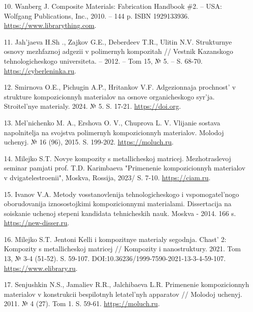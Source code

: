\begin{references}
10. Wanberg J. Composite Materials: Fabrication Handbook \#2. – USA:
Wolfgang Publications, Inc., 2010. – 144 p. ISBN
1929133936. \href{https://www.librarything.com/work/9709968}{https://www.librarything.com}.

11. Jah'jaeva H.Sh ., Zajkov G.E., Deberdeev T.R., Ulitin
N.V. Strukturnye osnovy mezhfaznoj adgezii v polimernyh kompozitah //
Vestnik Kazanskogo tehnologicheskogo universiteta. – 2012. – Tom 15, №
5. – S. 68-70.
\href{https://cyberleninka.ru/article/n/strukturnye-osnovy-mezhfaznoy-adgezii-nanoadgezii-v-polimernyh-kompozitah?ysclid=m6j2st57s6418214983}{https://cyberleninka.ru}. 

12. Smirnova O.E., Pichugin A.P., Hritankov V.F. Adgezionnaja
prochnost' v strukture kompozicionnyh materialov na osnove
organicheskogo syr'ja. Stroitel'nye materialy. 2024. №
5. S. 17-21. \href{https://doi.org/10.31659/0585-430X-2024-824-5-17-21}{https://doi.org}.

13. Mel'nichenko M. A., Ershova O. V., Chuprova L. V. Vlijanie sostava
napolnitelja na svojstva polimer\-nyh kompozicionnyh materialov. Molodoj
uchenyj. № 16 (96),
2015. S. 199-202. \href{https://moluch.ru/archive/96/21554/}{https://moluch.ru}.

14. Milejko S.T. Novye kompozity s metallicheskoj
matricej. Mezhotraslevoj seminar pamjati prof. T.D. Karimbaeva
"Primenenie kompozicionnyh materialov v dvigatelestroenii", Moskva,
Rossija, 2023/
S. 7-10. \href{https://ciam.ru/composites_theses/mileiko.pdf}{https://ciam.ru}.

15. Ivanov V.A. Metody vosstanovlenija tehnologicheskogo i
vspomogatel'nogo oborudovanija iznoso\-stojkimi kompozicionnymi
materialami. Dissertacija na soiskanie uchenoj stepeni kandidata
tehnicheskih nauk. Moskva - 2014. 166
s. \href{https://new-disser.ru/_avtoreferats/01007923651.pdf?ysclid=m6j2zfwyqg324913287}{https://new-disser.ru}.

16. Milejko S.T. Jentoni Kelli i kompozitnye materialy
segodnja. Chast' 2: Kompozity s metallicheskoj matricej // Kompozity i
nanostruktury. 2021. Tom 13, № 3-4
(51-52). S. 59-107. DOI:10.36236/1999-7590-2021-13-3-4-59-107. \href{https://www.elibrary.ru/item.asp?id=48118660&ysclid=m87loyv5gc289218394}{https://www.elibrary.ru}.

17. Senjushkin N.S., Jamaliev R.R., Jalchibaeva L.R. Primenenie
kompozicionnyh materialov v konstrukcii bespilotnyh letatel'nyh
apparatov // Molodoj uchenyj. 2011. № 4 (27). Tom
1. S. 59-61. \href{https://moluch.ru/archive/27/2963/?ysclid=m6j31n5ru1840809790}{https://moluch.ru}.


\end{references}
